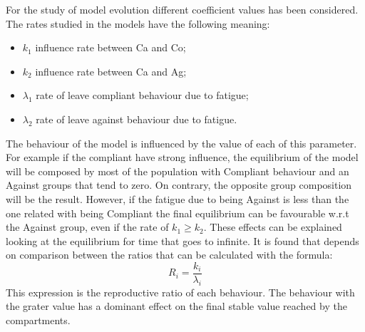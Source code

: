 For the study of model evolution different coefficient values has been considered.  The rates studied in the models have the following meaning:
\begin{itemize}
	\item $k_1$ influence rate between Ca and Co;
	\item $k_2$ influence rate between Ca and Ag;
	\item $\lambda_1$ rate of leave compliant behaviour due to fatigue;
	\item $\lambda_2$ rate of leave against behaviour due to fatigue.
\end{itemize}

The behaviour of the model is influenced by the value of each of this parameter. For example if the compliant have strong influence, the equilibrium of the model will be composed by most of the population with Compliant behaviour and an Against groups that tend to zero. On contrary, the opposite group composition will be the result. However, if the fatigue due to being Against is less than the one related with being Compliant the final equilibrium can be favourable w.r.t the Against group, even if the rate of $k_1 \ge k_2$.
These effects can be explained looking at the equilibrium for time that goes to infinite. It is found that depends on comparison between the ratios that can be calculated with the formula: 
\begin{equation}
	R_i =\frac{ k_i }{\lambda_i}
	\label{eq:behave_rate}
\end{equation}
This expression is the reproductive ratio of each behaviour. The behaviour with the grater value has a dominant effect on the final stable value reached by the compartments.

